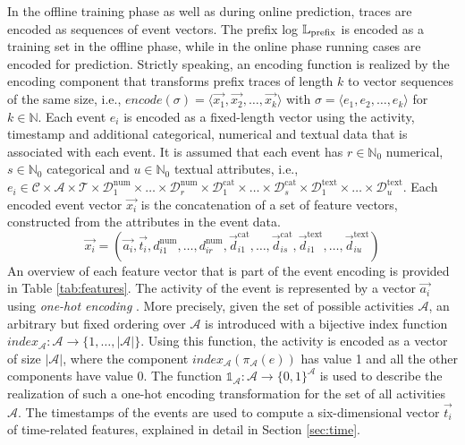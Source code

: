 In the offline training phase as well as during online prediction, traces are encoded as sequences of event vectors.
The prefix log $\mathbb{L}_\mathrm{prefix}$ is encoded as a training set in the offline phase, while in the online phase running cases are encoded for prediction.
Strictly speaking, an encoding function is realized by the encoding component that transforms prefix traces of length $k$ to vector sequences of the same size, i.e., $encode(\sigma) = \langle \vec{x_1}, \vec{x_2}, \dots, \vec{x_k}\rangle$ with $\sigma = \langle e_1, e_2, \dots, e_k\rangle$ for $k \in \mathbb{N}$.
Each event $e_i$ is encoded as a fixed-length vector using the activity, timestamp and additional categorical, numerical and textual data that is associated with each event.
It is assumed that each event has $r \in \mathbb{N}_0$ numerical, $s \in \mathbb{N}_0$ categorical and $u \in \mathbb{N}_0$ textual attributes, i.e., $e_i \in \mathcal{C} \times \mathcal{A}  \times \mathcal{T} \times \mathcal{D}_1^\mathrm{num} \times \dots \times \mathcal{D}_r^\mathrm{num}   \times \mathcal{D}_1^\mathrm{cat}  \times  \dots  \times \mathcal{D}_s^\mathrm{cat}   \times \mathcal{D}_1^\mathrm{text}   \times \dots  \times \mathcal{D}_u^\mathrm{text}$.
Each encoded event vector $\vec{x_i}$ is the concatenation of a set of feature vectors, constructed from the attributes in the event data.
\begin{equation*}
\vec{x_i}=(
\vec{a_i},
\vec{t_i},
d_{i1}^\mathrm{num}, \dots, d_{ir}^\mathrm{num},
\vec{d}_{i1}^\mathrm{cat}, \dots,\vec{d}_{is}^\mathrm{cat},
\vec{d}_{i1}^\mathrm{text}, \dots, \vec{d}_{iu}^\mathrm{text})
\end{equation*}
An overview of each feature vector that is part of the event encoding is provided in Table \ref{tab:features}.
The activity of the event is represented by a vector $\vec{a_i}$ using \textit{one-hot encoding} \cite{garavaglia1998smart}.
More precisely, given the set of possible activities $\mathcal{A}$, an arbitrary but fixed ordering over $\mathcal{A}$ is introduced with a bijective index function $index_\mathcal{A} \colon \mathcal{A} \to \{1, \dots, |\mathcal{A}|\}$.
Using this function, the activity is encoded as a vector of size $|\mathcal{A}|$, where the component $index_\mathcal{A}(\pi_\mathcal{A}(e))$ has value 1 and all the other components have value 0.
The function $\mathds{1}_\mathcal{A}\colon \mathcal{A} \to \{0,1\}^\mathcal{A}$ is used to describe the realization of such a one-hot encoding transformation for the set of all activities $\mathcal{A}$.
The timestamps of the events are used to compute a six-dimensional vector $\vec{t_i}$ of time-related features, explained in detail in Section \ref*{sec:time}.

